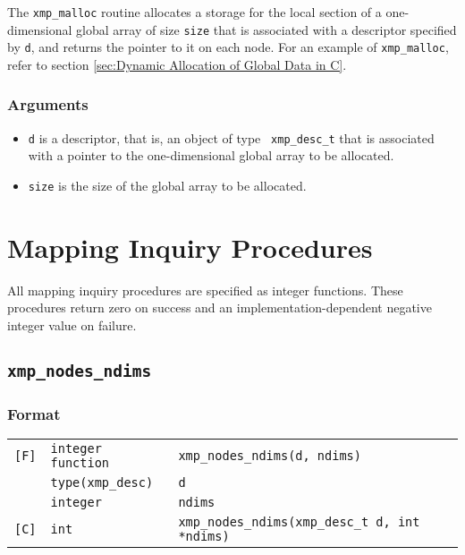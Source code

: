 The {\tt xmp\_malloc} routine allocates a storage for the local section
of a one-dimensional global array of size {\tt size} that is associated
with a descriptor specified by {\tt d}, and returns the pointer to it on
each node. For an example of {\tt xmp\_malloc}, refer to section 
\ref{sec:Dynamic Allocation of Global Data in C}.

\subsubsection*{Arguments}

\begin{itemize}
 \item {\tt d} is a descriptor, that is, an object of type {\tt
       xmp\_desc\_t} that is associated with a pointer to the
       one-dimensional global array to be allocated.
 \item {\tt size} is the size of the global array to be allocated.
\end{itemize}


\section{Mapping Inquiry Procedures}

All mapping inquiry procedures are specified as integer functions.
These procedures return zero on success and an implementation-dependent
negative integer value on failure.

\subsection{\tt xmp\_nodes\_ndims}

\subsubsection*{Format}

\begin{tabular}{lll}

\verb![F]!& {\tt integer function}& {\tt xmp\_nodes\_ndims(d, ndims)}\\
          & {\tt type(xmp\_desc)} & {\tt d}\\
          & {\tt integer} & {\tt ndims}\\

\verb![C]!&  {\tt int}& {\tt xmp\_nodes\_ndims(xmp\_desc\_t d, int *ndims)}\\

\end{tabular}

